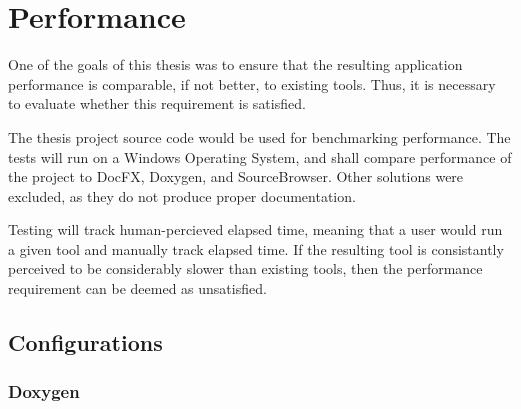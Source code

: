 \chapter{Performance}

One of the goals of this thesis was to ensure that the resulting application performance is comparable, if not better, to existing tools. Thus, it is necessary to evaluate whether this requirement is satisfied.

The thesis project source code would be used for benchmarking performance.
The tests will run on a Windows Operating System, and shall compare performance of the project to DocFX, Doxygen, and SourceBrowser. Other solutions were excluded, as they do not produce proper documentation.

Testing will track human-percieved elapsed time, meaning that a user would run a given tool and manually track elapsed time. If the resulting tool is consistantly perceived to be considerably slower than existing tools, then the performance requirement can be deemed as unsatisfied.

\section{Configurations}

\subsection{Doxygen}

